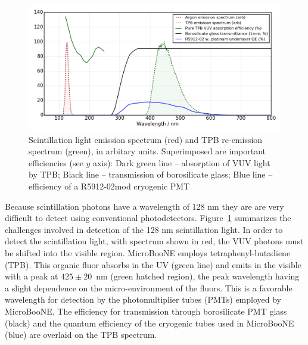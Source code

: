 \begin{figure}[t]
	\centering
\includegraphics[width=\textwidth]{./light_figures/pmttpbeff.png} 
        \caption{Scintillation light emission spectrum (red) and TPB re-emission spectrum (green), in arbitary units.  Superimposed are important efficiencies (see $y$ axis):  Dark green line -- absorption of VUV light by TPB;  Black line -- transmission of borosilicate glass;  Blue line -- efficiency of a R5912-02mod cryogenic PMT \cite{Benthesis} }\label{fig:lightchallenge}
\end{figure}


Because scintillation photons have a wavelength of 128 nm they are are very difficult to detect using conventional photodetectors.  Figure~\ref{fig:lightchallenge} summarizes the challenges involved in detection of the 128 nm scintillation light.  
In order to detect the scintillation light, with spectrum shown in red, the VUV photons must be shifted into the visible region.   MicroBooNE employs tetraphenyl-butadiene (TPB).
This organic fluor absorbs in the UV (green line) and emits in the visible with a peak at $425\pm20$~nm (green hatched region), the peak wavelength having a slight dependence on the micro-environment of the fluors.  This is a favorable wavelength for detection by the photomultiplier tubes (PMTs) employed by MicroBooNE.  The efficiency for transmission through borosilicate PMT glass (black) and the quantum efficiency of the cryogenic tubes used in MicroBooNE (blue) are overlaid on the TPB spectrum.


